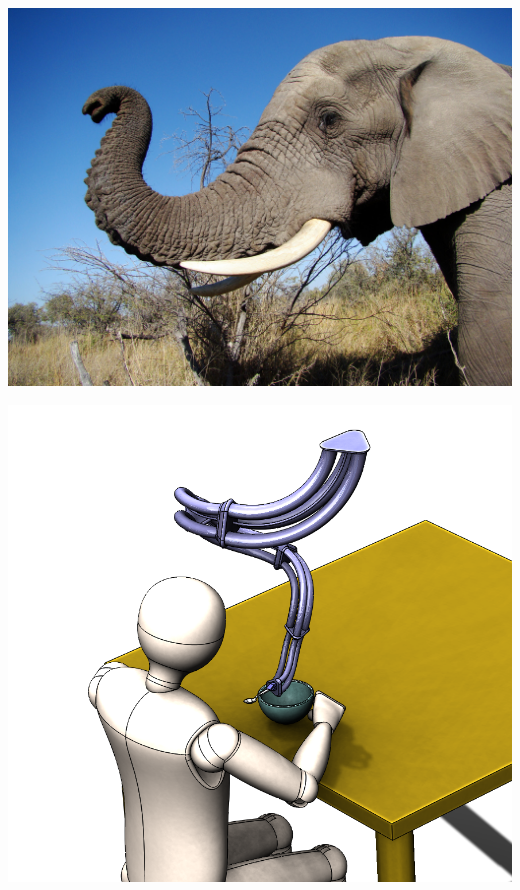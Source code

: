 \documentclass[25pt, a0paper, portrait]{tikzposter}
\begin{document}
{\begin{minipage}[t]{0.45\linewidth}
    \end{minipage} %
    \hspace{25pt}
    \begin{minipage}[t]{0.15\linewidth}
        \centering
        \begin{tikzfigure}
            \includegraphics[width=\linewidth, height=0.075\textheight]{images/elephant.jpg}
        \end{tikzfigure}
    \end{minipage} %
    \begin{minipage}[t]{0.15\linewidth}
        \centering
        \begin{tikzfigure}
            \includegraphics[width=\linewidth, height=0.075\textheight]{images/Application2.png}

\end{tikzfigure}
\end{minipage}}
\end{document}
